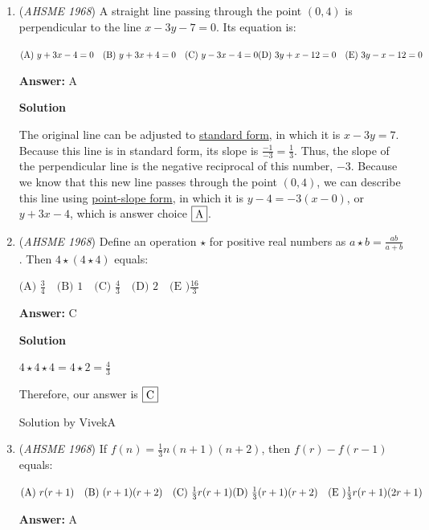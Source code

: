 \begin{enumerate}
 


	\item (\textit{AHSME 1968}) A straight line passing through the point $(0,4)$ is perpendicular to the line $x-3y-7=0$. Its equation is:


 $\text{(A) } y+3x-4=0\quad \text{(B) } y+3x+4=0\quad \text{(C) } y-3x-4=0\quad \\ \text{(D) } 3y+x-12=0\quad \text{(E) } 3y-x-12=0$

 \textbf{Answer: }A



\textbf{Solution}

The original line can be adjusted to \href{https://artofproblemsolving.com/wiki/index.php?title=Standard\_form}{standard form}, in which it is $x-3y=7$. Because this line is in standard form, its slope is $\frac{-1}{-3}=\frac{1}{3}$. Thus, the slope of the perpendicular line is the negative reciprocal of this number, $-3$. Because we know that this new line passes through the point $(0,4)$, we can describe this line using \href{https://artofproblemsolving.com/wiki/index.php?title=Point-slope\_form}{point-slope form}, in which it is $y-4=-3(x-0)$, or $y+3x-4$, which is answer choice $\fbox{A}$.

 


	\item (\textit{AHSME 1968}) Define an operation $\star$ for positive real numbers as $a\star b=\frac{ab}{a+b}$. Then $4 \star (4 \star 4)$ equals:


 $\text{(A) } \frac{3}{4}\quad \text{(B) } 1\quad \text{(C) } \frac{4}{3}\quad \text{(D) } 2\quad \text{(E )} \frac{16}{3}$

 \textbf{Answer: }C



\textbf{Solution}

$4 \star 4 \star 4 = 4 \star 2 = \frac{4}{3}$

 Therefore, our answer is $\fbox{C}$

 Solution by VivekA

 


	\item (\textit{AHSME 1968}) If $f(n)=\frac{1}{3} n(n+1)(n+2)$, then $f(r)-f(r-1)$ equals:


 $\text{(A) } r(r+1)\quad \text{(B) } (r+1)(r+2)\quad \text{(C) } \frac{1}{3} r(r+1)\quad  \\ \text{(D) } \frac{1}{3} (r+1)(r+2)\quad \text{(E )} \frac{1}{3} r(r+1)(2r+1)$

 \textbf{Answer: }A




\end{enumerate}
